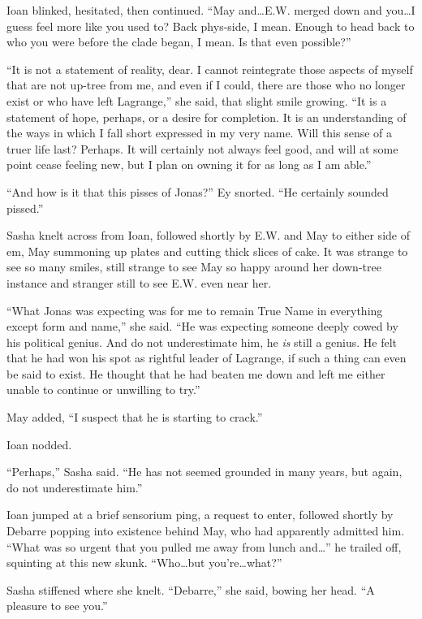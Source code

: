 Ioan blinked, hesitated, then continued. ``May and\ldots E.W. merged down and you\ldots I guess feel more like you used to? Back phys-side, I mean. Enough to head back to who you were before the clade began, I mean. Is that even possible?''

``It is not a statement of reality, dear. I cannot reintegrate those aspects of myself that are not up-tree from me, and even if I could, there are those who no longer exist or who have left Lagrange,'' she said, that slight smile growing. ``It is a statement of hope, perhaps, or a desire for completion. It is an understanding of the ways in which I fall short expressed in my very name. Will this sense of a truer life last? Perhaps. It will certainly not always feel good, and will at some point cease feeling new, but I plan on owning it for as long as I am able.''

``And how is it that this pisses of Jonas?'' Ey snorted. ``He certainly sounded pissed.''

Sasha knelt across from Ioan, followed shortly by E.W. and May to either side of em, May summoning up plates and cutting thick slices of cake. It was strange to see so many smiles, still strange to see May so happy around her down-tree instance and stranger still to see E.W. even near her.

``What Jonas was expecting was for me to remain True Name in everything except form and name,'' she said. ``He was expecting someone deeply cowed by his political genius. And do not underestimate him, he \emph{is} still a genius. He felt that he had won his spot as rightful leader of Lagrange, if such a thing can even be said to exist. He thought that he had beaten me down and left me either unable to continue or unwilling to try.''

May added, ``I suspect that he is starting to crack.''

Ioan nodded.

``Perhaps,'' Sasha said. ``He has not seemed grounded in many years, but again, do not underestimate him.''

Ioan jumped at a brief sensorium ping, a request to enter, followed shortly by Debarre popping into existence behind May, who had apparently admitted him. ``What was so urgent that you pulled me away from lunch and\ldots{}'' he trailed off, squinting at this new skunk. ``Who\ldots but you're\ldots what?''

Sasha stiffened where she knelt. ``Debarre,'' she said, bowing her head. ``A pleasure to see you.''

